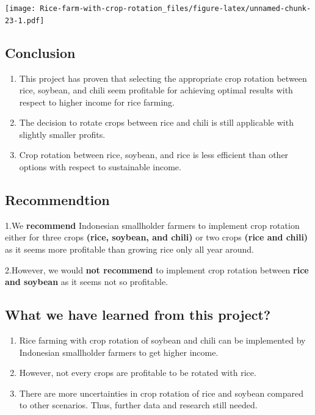 \documentclass[
]{article}
\providecommand{\tightlist}{%
  \setlength{\itemsep}{0pt}\setlength{\parskip}{0pt}}
\begin{document}
\texttt{[image: Rice-farm-with-crop-rotation\_files/figure-latex/unnamed-chunk-23-1.pdf]}

\hypertarget{conclusion}{%
\subsection{Conclusion}\label{conclusion}}

\begin{enumerate}
\def\labelenumi{\arabic{enumi}.}
\tightlist
\item
  This project has proven that selecting the appropriate crop rotation
  between rice, soybean, and chili seem profitable for achieving optimal
  results with respect to higher income for rice farming.
\item
  The decision to rotate crops between rice and chili is still
  applicable with slightly smaller profits.
\item
  Crop rotation between rice, soybean, and rice is less efficient than
  other options with respect to sustainable income.
\end{enumerate}

\hypertarget{recommendtion}{%
\subsection{Recommendtion}\label{recommendtion}}

1.We \textbf{recommend} Indonesian smallholder farmers to implement crop
rotation either for three crops \textbf{(rice, soybean, and chili)} or
two crops \textbf{(rice and chili)} as it seems more profitable than
growing rice only all year around.

2.However, we would \textbf{not recommend} to implement crop rotation
between \textbf{rice and soybean} as it seems not so profitable.

\hypertarget{what-we-have-learned-from-this-project}{%
\subsection{What we have learned from this
project?}\label{what-we-have-learned-from-this-project}}

\begin{enumerate}
\def\labelenumi{\arabic{enumi}.}
\tightlist
\item
  Rice farming with crop rotation of soybean and chili can be
  implemented by Indonesian smallholder farmers to get higher income.
\item
  However, not every crops are profitable to be rotated with rice.
\item
  There are more uncertainties in crop rotation of rice and soybean
  compared to other scenarios. Thus, further data and research still
  needed.
\end{enumerate}
\end{document}
